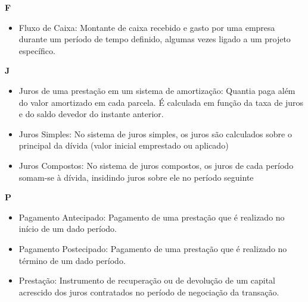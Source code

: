 \textbf{F}
\begin{itemize}
 \item Fluxo de Caixa:
    Montante de caixa recebido e gasto por uma empresa durante um período de tempo definido, algumas vezes ligado a um projeto específico. 
\end{itemize}

\textbf{J}
\begin{itemize}
 \item Juros de uma prestação em um sistema de amortização:
    Quantia paga além do valor amortizado em cada parcela. É calculada em função da taxa de juros e do saldo devedor do instante anterior. 

\item Juros Simples:
    No sistema de juros simples, os juros são calculados sobre o principal da dívida (valor inicial emprestado ou aplicado) 

\item Juros Compostos:
    No sistema de juros compostos, os juros de cada período somam-se à dívida, insidindo juros sobre ele no período seguinte 
\end{itemize}

\textbf{P}
\begin{itemize}
 \item Pagamento Antecipado:
Pagamento de uma prestação que é realizado no início de um dado período.

\item Pagamento Postecipado:
Pagamento de uma prestação que é realizado no término de um dado período.

\item Prestação:
    Instrumento de recuperação ou de devolução de um capital acrescido dos juros contratados no período de negociação da transação. 
\end{itemize}

